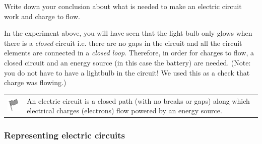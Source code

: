         \par 
        \label{m38771*id62757}Write down your conclusion about what is needed to make an electric circuit work and charge to flow.
 \par 
        \label{m38771*id62768}In the experiment above, you will have seen that the light bulb only glows when there is a \textsl{closed} circuit i.e. there are no gaps in the circuit and all the circuit elements are connected in a \textsl{closed loop}. Therefore, in order for charges to flow, a closed circuit and an energy source (in this case the battery) are needed. (Note: you do not have to have a lightbulb in the circuit! We used this as a check that charge was flowing.)\par 
\label{m38771*fhsst!!!underscore!!!id128}\begin{definition}
	  \begin{tabular*}{15 cm}{m{15 mm}m{}}
	\hspace*{-50pt}  \includegraphics[width=0.5in]{col11305.imgs/psflag2.png}   & \Definition{   \label{id2477990}\textbf{ Electric circuit }} { \label{m38771*meaningfhsst!!!underscore!!!id128}
        \label{m38771*id62792}An electric circuit is a closed path (with no breaks or gaps) along which electrical charges (electrons) flow powered by an energy source. \par 
         } 
      \end{tabular*}
      \end{definition}
      \label{m38771*uid10}
            \subsubsection{ Representing electric circuits}
            \nopagebreak
        \label{m38771*uid11}
